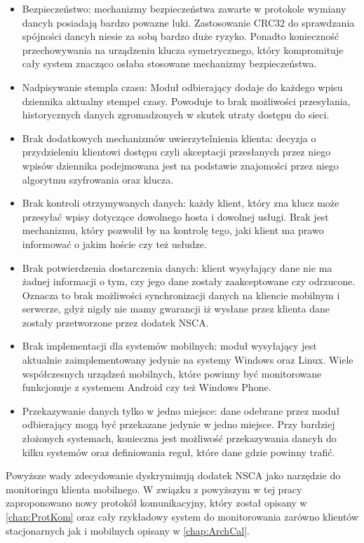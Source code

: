 \begin{itemize}
\item Bezpieczeństwo: mechanizmy bezpieczeństwa zawarte w protokole
  wymiany dancyh posiadają bardzo powazne luki. Zastosowanie CRC32 do
  sprawdzania spójności dancyh niesie za sobą bardzo duże
  ryzyko. Ponadto konieczność przechowywania na urządzeniu klucza
  symetrycznego, który kompromituje cały system znacząco osłaba
  stosowane mechanizmy bezpieczeństwa.
\item Nadpisywanie stempla czasu: Moduł odbierający dodaje do każdego
  wpisu dziennika aktualny stempel czasy. Powoduje to brak możliwości
  przesyłania, historycznych danych zgromadzonych w skutek utraty
  dostępu do sieci.
\item Brak dodatkowych mechanizmów uwierzytelnienia klienta: decyzja o
  przydzieleniu klientowi dostępu czyli akceptacji przesłanych przez
  niego wpisów dziennika podejmowana jest na podstawie znajomości
  przez niego algorytmu szyfrowania oraz klucza.
\item Brak kontroli otrzymywanych danych: każdy klient, który zna
  klucz może przesyłać wpisy dotyczące dowolnego hosta i dowolnej
  usługi. Brak jest mechanizmu, który pozwolił by na kontrolę tego,
  jaki klient ma prawo informować o jakim hoście czy też usłudze.
\item Brak potwierdzenia dostarczenia danych: klient wysyłający dane
  nie ma żadnej informacji o tym, czy jego dane zostały zaakceptowane
  czy odrzucone. Oznacza to brak możliwości synchronizacji danych na
  kliencie mobilnym i serwerze, gdyż nigdy nie mamy gwarancji iż
  wysłane przez klienta dane zostały przetworzone przez dodatek NSCA.
\item Brak implementacji dla systemów mobilnych: moduł wysyłający jest
  aktualnie zaimplementowany jedynie na systemy Windows oraz
  Linux. Wiele współczesnych urządzeń mobilnych, które powinny być
  monitorowane funkcjonuje z systemem Android czy też Windows Phone.
\item Przekazywanie danych tylko w jedno miejsce: dane odebrane przez
  moduł odbierający mogą być przekazane jedynie w jedno miejsce. Przy
  bardziej złożonych systemach, konieczna jest możliwość przekazywania
  dancyh do kilku systemów oraz definiowania reguł, które dane gdzie
  powinny trafić.
\end{itemize}

Powyższe wady zdecydowanie dyskryminują dodatek NSCA jako narzędzie do
monitoringu klienta mobilnego. W związku z powyższym w tej pracy
zaproponowano nowy protokół komunikacyjny, który został opisany w
\ref{chap:ProtKom} oraz cały rzykładowy system do monitorowania
zarówno klientów stacjonarnych jak i mobilnych opisany w
\ref{chap:ArchCal}.

